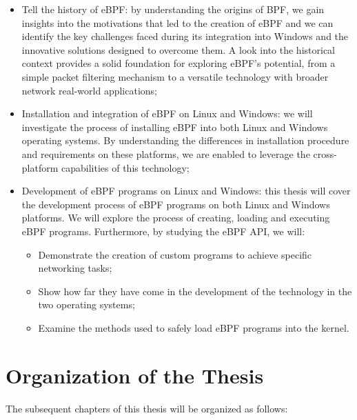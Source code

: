 \begin{itemize}
	\item 
		Tell the history of eBPF: by understanding the origins of BPF, we gain insights into the motivations that led to the creation of eBPF and we can identify the key challenges faced during its integration into Windows and the innovative solutions designed to overcome them. 
		A look into the historical context provides a solid foundation for exploring eBPF's potential, from a simple packet filtering mechanism to a versatile technology with broader network real-world applications;
	\item 
		Installation and integration of eBPF on Linux and Windows: we will investigate the process of installing eBPF into both Linux and Windows operating systems. 
		By understanding the differences in installation procedure and requirements on these platforms, we are enabled to leverage the cross-platform capabilities of this technology;
	\item 
		Development of eBPF programs on Linux and Windows: this thesis will cover the development process of eBPF programs on both Linux and Windows platforms. 
		We will explore the process of creating, loading and executing eBPF programs.
		Furthermore, by studying the eBPF API, we will:
		\begin{itemize}
			\item 
				Demonstrate the creation of custom programs to achieve specific networking tasks;
			\item 
				Show how far they have come in the development of the technology in the two operating systems;
			\item 
				Examine the methods used to safely load eBPF programs into the kernel. 
		\end{itemize}
\end{itemize}

\section{Organization of the Thesis}

The subsequent chapters of this thesis will be organized as follows:

